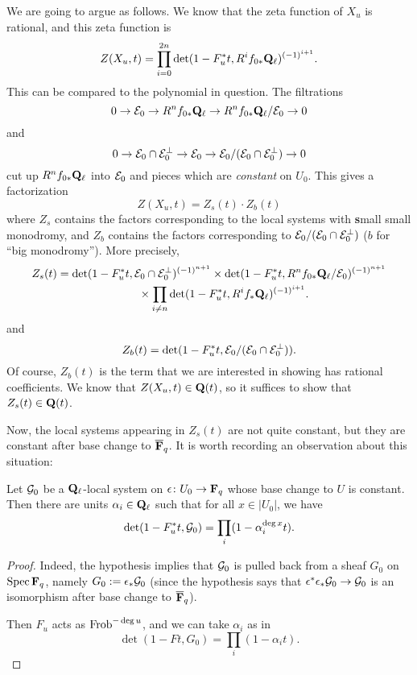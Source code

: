 We are going to argue as follows. We know that the zeta function of $X_u$ is rational, and this zeta function is 
\[
Z(X_u, t) =  \prod_{i=0}^{2n} \det(1-F_u^* t, R^i f_{0*}  \mathbf{Q}_{\ell})^{(-1)^{i+1}}.
\]
This can be compared to the polynomial in question. The filtrations
\[
0 \rightarrow \mathcal{E}_0 \rightarrow R^n f_{0*}  \mathbf{Q}_{\ell} \rightarrow R^n f_{0*} \mathbf{Q}_{\ell} / \mathcal{E}_0 \rightarrow 0
\]
and 
\[
0 \rightarrow \mathcal{E}_0 \cap \mathcal{E}_0^{\perp} \rightarrow  \mathcal{E}_0 \rightarrow \mathcal{E}_0/(\mathcal{E}_0 \cap \mathcal{E}_0^{\perp}) \rightarrow 0
\]
cut up $R^n f_{0*}  \mathbf{Q}_{\ell}$ into $\mathcal{E}_0$ and pieces which are \emph{constant} on $U_0$. This gives a factorization 
\[
Z (X_u, t) = Z_s(t) \cdot Z_b(t)
\]
where $Z_s$ contains the factors corresponding to the local systems with \textbf{s}mall small monodromy, and $Z_b$ contains the factors corresponding to $\mathcal{E}_0/(\mathcal{E}_0 \cap \mathcal{E}_0^{\perp})$ ($b$ for ``big monodromy''). More precisely, 
\begin{align*}
Z_s(t) &= \det (1- F_u^* t,   \mathcal{E}_0 \cap \mathcal{E}_0^{\perp} )^{(-1)^{n+1}}  \times \det (1- F_u^* t, R^n f_{0*} \mathbf{Q}_{\ell} / \mathcal{E}_0 )^{(-1)^{n+1}}  \\
& \hspace{1in} \times \prod_{i\neq n} \det(1-F_u^* t, R^i f_* \mathbf{Q}_{\ell})^{(-1)^{i+1}}.
\end{align*}
and 
\[
Z_b(t) =  \det (1- F_u^* t, \mathcal{E}_0/(\mathcal{E}_0 \cap \mathcal{E}_0^{\perp})).
\]
Of course, $Z_b(t)$ is the term that we are interested in showing has rational coefficients. We know that $Z(X_u, t) \in \mathbf{Q}(t)$, so it suffices to show that $Z_s(t) \in \mathbf{Q}(t)$. 

Now, the local systems appearing in $Z_s(t)$ are not quite constant, but they are constant after base change to $\overline{\mathbf{F}}_q$. It is worth recording an observation about this situation:


\begin{lem}
Let $\mathcal{G}_0$ be a $\mathbf{Q}_{\ell}$-local system on $\epsilon \colon U_0 \rightarrow \mathbf{F}_q$ whose base change to $U$ is constant. Then there are units $\alpha_i \in \mathbf{Q}_{\ell}$ such that for all $x \in |U_0|$, we have 
\[
\det (1-F_u^*t, \mathcal{G}_0) = \prod_i (1-\alpha_i^{\deg x} t).
\]
\end{lem}

\begin{proof}
Indeed, the hypothesis implies that $\mathcal{G}_0$ is pulled back from a sheaf $G_0$ on $\operatorname{Spec} \mathbf{F}_q$, namely $G_0 := \epsilon_* \mathcal{G}_0$ (since the hypothesis says that $\epsilon^* \epsilon_* \mathcal{G}_0 \rightarrow \mathcal{G}_0$ is an isomorphism after base change to $\overline{\mathbf{F}}_q$). 

Then $F_u$ acts as $\operatorname{Frob}^{-\deg u}$, and we can take $\alpha_i$ as in 
\[
\det (1- F t, G_0) = \prod_i (1-\alpha_i t).
\]
\end{proof}

